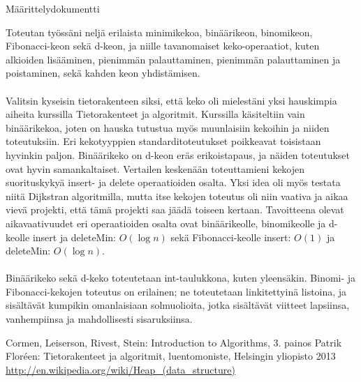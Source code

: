\documentclass[12pt]{report}
\begin{document}
\begin{center}
  Määrittelydokumentti
\end{center}
Toteutan työssäni neljä erilaista minimikekoa, binäärikeon, binomikeon, Fibonacci-keon sekä d-keon, ja niille tavanomaiset keko-operaatiot, kuten alkioiden lisääminen, pienimmän palauttaminen, pienimmän palauttaminen ja poistaminen, sekä kahden keon yhdistämisen. \\
\ \\
Valitsin kyseisin tietorakenteen siksi, että keko oli mielestäni yksi hauskimpia aiheita kurssilla Tietorakenteet ja algoritmit. Kurssilla käsiteltiin vain binäärikekoa, joten on hauska tutustua myös muunlaisiin kekoihin ja niiden toteutuksiin. Eri kekotyyppien standarditoteutukset poikkeavat toisistaan hyvinkin paljon. Binäärikeko on d-keon eräs erikoistapaus, ja näiden toteutukset ovat hyvin samankaltaiset. 
Vertailen keskenään toteuttamieni kekojen suorituskykyä insert- ja delete operaatioiden osalta. Yksi idea oli myös testata niitä Dijkstran algoritmilla, mutta itse kekojen toteutus oli niin vaativa ja aikaa vievä projekti, että tämä projekti saa jäädä toiseen kertaan. 
Tavoitteena olevat aikavaativuudet eri operaatioiden osalta ovat binäärikeolle, binomikeolle ja d-keolle insert ja deleteMin: $O(\log n)$ sekä Fibonacci-keolle insert: $O(1)$ ja deleteMin: $O(\log n)$.\\
\ \\
Binäärikeko sekä d-keko toteutetaan int-taulukkona, kuten yleensäkin. Binomi- ja Fibonacci-kekojen toteutus on erilainen; ne toteutetaan linkitettyinä listoina, ja sisältävät kumpikin omanlaisiaan solmuolioita, jotka sisältävät viitteet lapsiinsa, vanhempiinsa ja mahdollisesti sisaruksiinsa. 

\begin{thebibliography}{99}
 Cormen, Leiserson, Rivest, Stein: Introduction to Algorithms, 3. painos
 Patrik Floréen: Tietorakenteet ja algoritmit, luentomoniste, Helsingin yliopisto 2013
 \url{http://en.wikipedia.org/wiki/Heap_(data_structure)}
\end{thebibliography}
\end{document}
